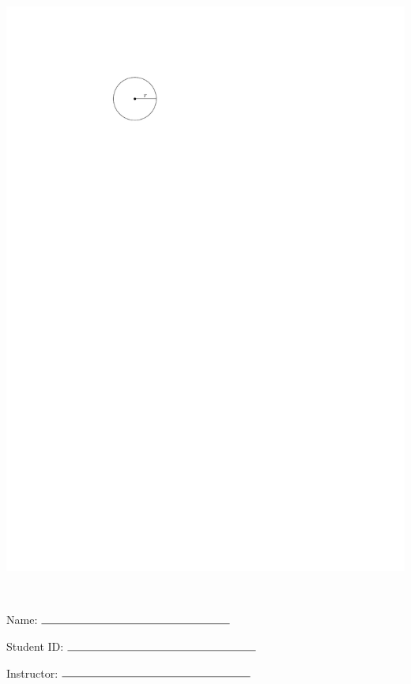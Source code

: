 \documentclass[12pt]{amsart}
\begin{document}
\begin{enumerate}
\includegraphics[scale = 0.8]{circle}

\vspace{1cm}
\newpage  $ $   \newpage\end{enumerate}\graphicspath{{/Users/jilan/Downloads/Randomizer/Randomizer/Sample Course/Sample Assessment/}}\setcounter{page}{1}


\thispagestyle{fancy}

 
\noindent Name: $\rule{6cm}{0.15mm}$

\vspace{.2cm}

\noindent Student ID: $\rule{6cm}{0.15mm}$

\vspace{.2cm}

\noindent Instructor: $\rule{6cm}{0.15mm}$
\end{document}

